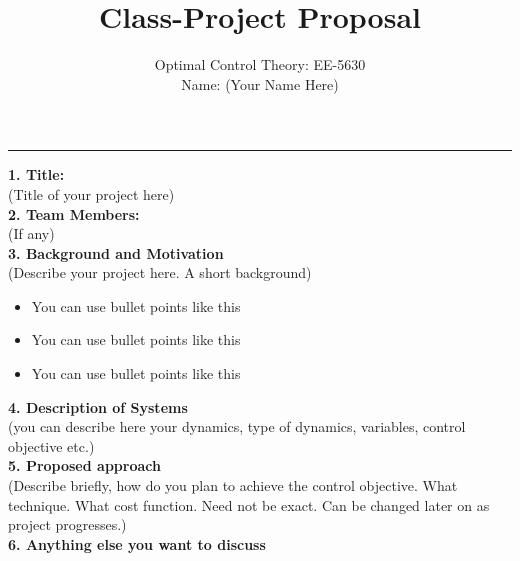 \documentclass[12pt]{project_proposal}
\begin{document}


\title{Class-Project Proposal}

\author{Optimal Control Theory: EE-5630\\
Name: (Your Name Here)\\}

\maketitle

\hrule
\vspace{5mm}
\textbf{1. Title:}\\

(Title of your project here)\\

\textbf{2. Team Members:}\\

(If any)\\

\textbf{3. Background and Motivation}\\
(Describe your project here. A short background)
\begin{itemize}
\item You can use bullet points like this
\item You can use bullet points like this
\item You can use bullet points like this
\end{itemize}



\textbf{4. Description of Systems}\\
(you can describe here your dynamics, type of dynamics, variables, control objective etc.)\\


\textbf{5. Proposed approach}\\
(Describe briefly, how do you plan to achieve the control objective. What technique. What cost function. Need not be exact. Can be changed later on as project progresses.)\\

\textbf{6. Anything else you want to discuss}\\






\end{document}
